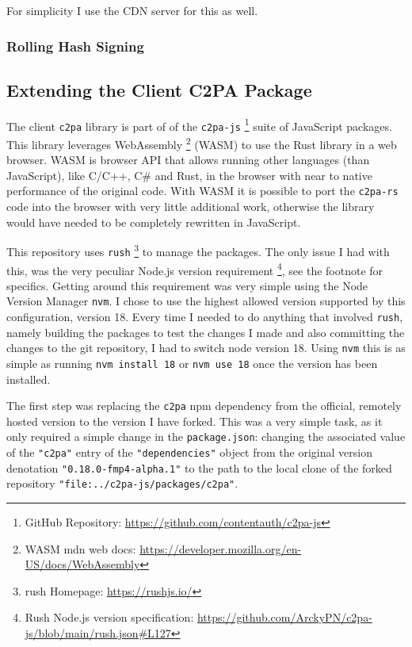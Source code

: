 For simplicity I use the CDN server for this as well.

\subsubsection{Rolling Hash Signing\label{sec:rolling_hash_sign}}


\subsection{Extending the Client C2PA Package\label{sec:wasm}}

The client \texttt{c2pa} library is part of of the \texttt{c2pa-js} \footnote{GitHub Repository: \url{https://github.com/contentauth/c2pa-js}} suite of JavaScript packages. This library leverages WebAssembly \footnote{WASM mdn web docs: \url{https://developer.mozilla.org/en-US/docs/WebAssembly}} (WASM) to use the Rust library in a web browser. WASM is browser API that allows running other languages (than JavaScript), like C/C++, C$\#$ and Rust, in the browser with near to native performance of the original code. With WASM it is possible to port the \texttt{c2pa-rs} code into the browser with very little additional work, otherwise the library would have needed to be completely rewritten in JavaScript.

This repository uses \texttt{rush} \footnote{rush Homepage: \url{https://rushjs.io/}} to manage the packages. The only issue I had with this, was the very peculiar Node.js version requirement \footnote{Rush Node.js version specification: \url{https://github.com/ArckyPN/c2pa-js/blob/main/rush.json\#L127}}, see the footnote for specifics. Getting around this requirement was very simple using the Node Version Manager \texttt{nvm}. I chose to use the highest allowed version supported by this configuration, version 18. Every time I needed to do anything that involved \texttt{rush}, namely building the packages to test the changes I made and also committing the changes to the git repository, I had to switch node version 18. Using \texttt{nvm} this is as simple as running \texttt{nvm install 18} or \texttt{nvm use 18} once the version has been installed.

The first step was replacing the \texttt{c2pa} npm dependency from the official, remotely hosted version to the version I have forked. This was a very simple task, as it only required a simple change in the \texttt{package.json}: changing the associated value of the \texttt{"c2pa"} entry of the \texttt{"dependencies"} object from the original version denotation \texttt{"0.18.0-fmp4-alpha.1"} to the path to the local clone of the forked repository \texttt{"file:../c2pa-js/packages/c2pa"}.

